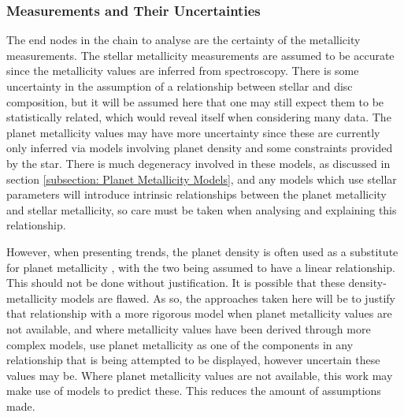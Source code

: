 \documentclass[a4paper,twocolumn,12pt]{article}
\begin{document}
\subsubsection{Measurements and Their Uncertainties}
The end nodes in the chain to analyse are the certainty of the metallicity measurements. The stellar metallicity measurements are assumed to be accurate since the metallicity values are inferred from spectroscopy. There is some uncertainty in the assumption of a relationship between stellar and disc composition, but it will be assumed here that one may still expect them to be statistically related, which would reveal itself when considering many data. The planet metallicity values may have more uncertainty since these are currently only inferred via models involving planet density and some constraints provided by the star. There is much degeneracy involved in these models, as discussed in section \ref{subsection: Planet Metallicity Models}, and any models which use stellar parameters will introduce intrinsic relationships between the planet metallicity and stellar metallicity, so care must be taken when analysing and explaining this relationship.



However, when presenting trends, the planet density is often used as a substitute for planet metallicity \cite{Wilson}, with the two being assumed to have a linear relationship. This should not be done without justification. It is possible that these density-metallicity models are flawed. As so, the approaches taken here will be to justify that relationship with a more rigorous model when planet metallicity values are not available, and where metallicity values have been derived through more complex models, use planet metallicity as one of the components in any relationship that is being attempted to be displayed, however uncertain these values may be. Where planet metallicity values are not available, this work may make use of models to predict these. This reduces the amount of assumptions made.
\end{document}
